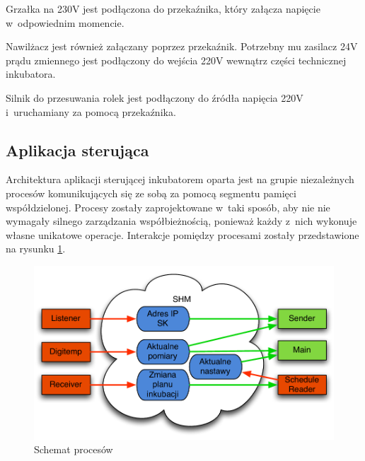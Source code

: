 Grzałka na 230V jest podłączona do przekaźnika, który załącza napięcie w~odpowiednim momencie.

Nawilżacz jest również załączany poprzez przekaźnik. Potrzebny mu zasilacz 24V
prądu zmiennego jest podłączony do wejścia 220V wewnątrz części technicznej inkubatora.

Silnik do przesuwania rolek jest podłączony do źródła napięcia 220V
i~uruchamiany za pomocą przekaźnika.

\subsection{Aplikacja sterująca}
Architektura aplikacji sterującej inkubatorem oparta jest na grupie niezależnych
procesów komunikujących się ze sobą za pomocą segmentu pamięci współdzielonej.
Procesy zostały zaprojektowane w~taki sposób, aby nie nie wymagały silnego
zarządzania współbieżnością, ponieważ każdy z~nich wykonuje własne unikatowe
operacje. Interakcje pomiędzy procesami zostały przedstawione na rysunku
\ref{rys:SHM}.

\begin{figure}[t] 
\centering\includegraphics[width=\textwidth]{figures/SHM}
\caption{Schemat procesów}\label{rys:SHM}
\end{figure}

